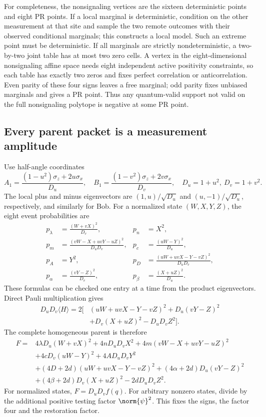 For completeness, the nonsignaling vertices are the sixteen deterministic points and eight PR points. If a local marginal is deterministic, condition on the other measurement at that site and sample the two remote outcomes with their observed conditional marginals; this constructs a local model. Such an extreme point must be deterministic. If all marginals are strictly nondeterministic, a two-by-two joint table has at most two zero cells. A vertex in the eight-dimensional nonsignaling affine space needs eight independent active positivity constraints, so each table has exactly two zeros and fixes perfect correlation or anticorrelation. Even parity of these four signs leaves a free marginal; odd parity fixes unbiased marginals and gives a PR point. Thus any quantum-valid support not valid on the full nonsignaling polytope is negative at some PR point.

\subsection{Every parent packet is a measurement amplitude}
Use half-angle coordinates
\[
A_1=\frac{(1-u^2)\sigma_z+2u\sigma_x}{D_u},\quad
B_1=\frac{(1-v^2)\sigma_z+2v\sigma_x}{D_v},\quad
D_u=1+u^2,\ D_v=1+v^2.
\]
The local plus and minus eigenvectors are $(1,u)/\sqrt{D_u}$ and $(u,-1)/\sqrt{D_u}$, respectively, and similarly for Bob. For a normalized state $(W,X,Y,Z)$, the eight event probabilities are
\begin{align*}
p_\lambda&=\frac{(W+vX)^2}{D_v},&p_n&=X^2,\\
p_m&=\frac{(vW-X+uvY-uZ)^2}{D_uD_v},&p_c&=\frac{(uW-Y)^2}{D_u},\\
p_A&=Y^2,&p_D&=\frac{(uW+uvX-Y-vZ)^2}{D_uD_v},\\
p_\alpha&=\frac{(vY-Z)^2}{D_v},&p_\beta&=\frac{(X+uZ)^2}{D_u}.
\end{align*}
These formulas can be checked one entry at a time from the product eigenvectors. Direct Pauli multiplication gives
\begin{align*}
D_uD_v\langle H\rangle=2\big[&(uW+uvX-Y-vZ)^2+D_u(vY-Z)^2\\
&+D_v(X+uZ)^2-D_uD_vZ^2\big].
\end{align*}
The complete homogeneous parent is therefore
\begin{align*}
F={}&4\lambda D_u(W+vX)^2+4nD_uD_vX^2
 +4m(vW-X+uvY-uZ)^2\\
&+4cD_v(uW-Y)^2+4AD_uD_vY^2\\
&+(4D+2d)(uW+uvX-Y-vZ)^2+(4\alpha+2d)D_u(vY-Z)^2\\
&+(4\beta+2d)D_v(X+uZ)^2-2dD_uD_vZ^2.\tag{P}\label{p0c8f420148b7:eq:parent}
\end{align*}
For normalized states, $F=D_uD_v f(q)$. For arbitrary nonzero states, divide by the additional positive testing factor $\norm{\psi}^2$. This fixes the signs, the factor four and the restoration factor.

